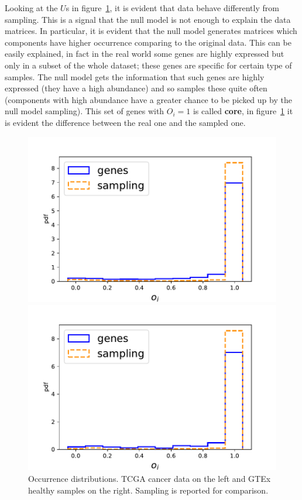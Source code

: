 Looking at the $U$s in figure~\ref{fig:structure/globalU_null}, it is evident that data behave differently from sampling. This is a signal that the null model is not enough to explain the data matrices. In particular, it is evident that the null model generates matrices which components have higher occurrence comparing to the original data. This can be easily explained, in fact in the real world some genes are highly expressed but only in a subset of the whole dataset; these genes are specific for certain type of samples. The null model gets the information that such genes are highly expressed (they have a high abundance) and so samples these quite often (components with high abundance have a greater chance to be picked up by the null model sampling). This set of genes with $O_i=1$ is called \textbf{core}, in figure~\ref{fig:structure/globalU_null} it is evident the difference between the real one and the sampled one.
\begin{figure}[htb!]
\begin{minipage}{0.5\textwidth}
    \centering
    \includegraphics[width=0.95\linewidth]{pictures/structure/tcga/globalU_null.pdf}
\end{minipage}
\hspace{2mm}
\begin{minipage}{0.5\textwidth}
    \centering
    \includegraphics[width=0.95\linewidth]{pictures/structure/gtex/globalU_null.pdf}
    \end{minipage}
\caption{Occurrence distributions. TCGA cancer data on the left and GTEx healthy samples on the right. Sampling is reported for comparison.}
\label{fig:structure/globalU_null}
\end{figure}

